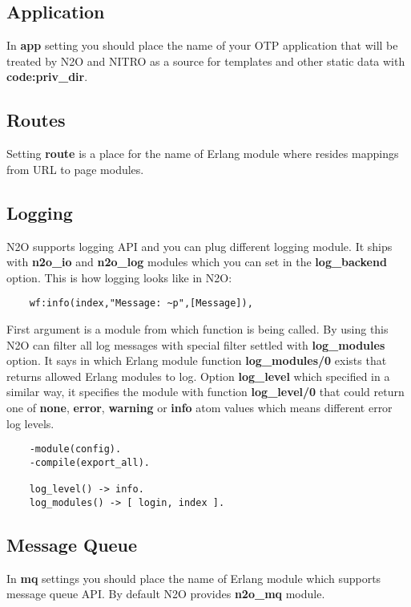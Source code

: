 \newpage

\subsection*{Application}
In {\bf app} setting you should place the name of your OTP application
that will be treated by N2O and NITRO as a source for templates and
other static data with {\bf code:priv\_dir}.

\subsection*{Routes}
Setting {\bf route} is a place for the name of Erlang module where
resides mappings from URL to page modules.

\subsection*{Logging}
N2O supports logging API and you can plug different logging module.
It ships with {\bf n2o\_io} and {\bf n2o\_log} modules which you can set in the
{\bf log\_backend} option. This is how logging looks like in N2O:

\vspace{1\baselineskip}
\begin{lstlisting}
    wf:info(index,"Message: ~p",[Message]),
\end{lstlisting}
\vspace{1\baselineskip}

First argument is a module from which function is being called. By using this
N2O can filter all log messages with special filter settled with {\bf log\_modules} option.
It says in which Erlang module function {\bf log\_modules/0} exists that
returns allowed Erlang modules to log. Option {\bf log\_level} which specified
in a similar way, it specifies the module with function {\bf log\_level/0} that could
return one of {\bf none}, {\bf error}, {\bf warning} or {\bf info} atom values which
means different error log levels.

\vspace{1\baselineskip}
\begin{lstlisting}
    -module(config).
    -compile(export_all).

    log_level() -> info.
    log_modules() -> [ login, index ].
\end{lstlisting}
\vspace{1\baselineskip}

\newpage
\subsection*{Message Queue}
In {\bf mq} settings you should place the name of Erlang module which supports
message queue API. By default N2O provides {\bf n2o\_mq} module.

